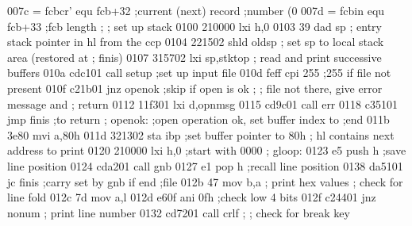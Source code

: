 007c =                      fcbcr'   equ  fcb+32    ;current (next) record
                                                    ;number (0
007d =                      fcbin    equ  fcb+33    ;fcb length
                            ; 
                            ;        set up stack
0100 210000                          lxi  h,0
0103 39                              dad  sp
                            ;        entry stack pointer in hl from the ccp
0104 221502                          shld oldsp
                            ;        set sp to local stack area (restored at 
                            ;        finis)
0107 315702                          lxi  sp,stktop
                            ;        read and print successive buffers
010a cdc101                          call setup     ;set up input file
010d feff                            cpi  255       ;255 if file not present
010f c21b01                          jnz  openok    ;skip if open is ok
                            ;        
                            ;        file not there, give error message and
                            ;        return
0112 11f301                          lxi  d,opnmsg
0115 cd9c01                          call err
0118 c35101                          jmp finis      ;to return
                            ;
                            openok:  ;open operation ok, set buffer index to
                                     ;end
011b 3e80                            mvi  a,80h
011d 321302                          sta  ibp       ;set buffer pointer to 80h
                            ;        hl contains next address to print
0120 210000                          lxi  h,0       ;start with 0000 
                            ;
                            gloop:
0123 e5                              push h         ;save line position
0124 cda201                          call gnb
0127 e1                              pop  h         ;recall line position
0138 da5101                          jc   finis     ;carry set by gnb if end
                                                    ;file
012b 47                              mov  b,a
                            ;        print hex values
                            ;        check for line fold
012c 7d
                                     mov  a,l
012d e60f                            ani  0fh       ;check low 4 bits
012f c24401                          jnz nonum
                            ;        print line number
0132 cd7201                          call crlf
                            ;
                            ;        check for break key
